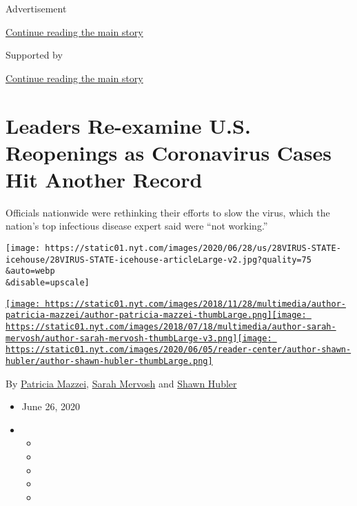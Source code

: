 Advertisement

\protect\hyperlink{after-top}{Continue reading the main story}

Supported by

\protect\hyperlink{after-sponsor}{Continue reading the main story}

\hypertarget{leaders-re-examine-us-reopenings-as-coronavirus-cases-hit-another-record}{%
\section{Leaders Re-examine U.S. Reopenings as Coronavirus Cases Hit
Another
Record}\label{leaders-re-examine-us-reopenings-as-coronavirus-cases-hit-another-record}}

Officials nationwide were rethinking their efforts to slow the virus,
which the nation's top infectious disease expert said were ``not
working.''

\texttt{[image: https://static01.nyt.com/images/2020/06/28/us/28VIRUS-STATE-icehouse/28VIRUS-STATE-icehouse-articleLarge-v2.jpg?quality=75\\\&auto=webp\\\&disable=upscale]}

\href{https://www.nytimes.com/by/patricia-mazzei}{\texttt{[image: https://static01.nyt.com/images/2018/11/28/multimedia/author-patricia-mazzei/author-patricia-mazzei-thumbLarge.png]}}\href{https://www.nytimes.com/by/sarah-mervosh}{\texttt{[image: https://static01.nyt.com/images/2018/07/18/multimedia/author-sarah-mervosh/author-sarah-mervosh-thumbLarge-v3.png]}}\href{https://www.nytimes.com/by/shawn-hubler}{\texttt{[image: https://static01.nyt.com/images/2020/06/05/reader-center/author-shawn-hubler/author-shawn-hubler-thumbLarge.png]}}

By \href{https://www.nytimes.com/by/patricia-mazzei}{Patricia Mazzei},
\href{https://www.nytimes.com/by/sarah-mervosh}{Sarah Mervosh} and
\href{https://www.nytimes.com/by/shawn-hubler}{Shawn Hubler}

\begin{itemize}
\item
  June 26, 2020
\item
  \begin{itemize}
  \item
  \item
  \item
  \item
  \item
  \end{itemize}
\end{itemize}

